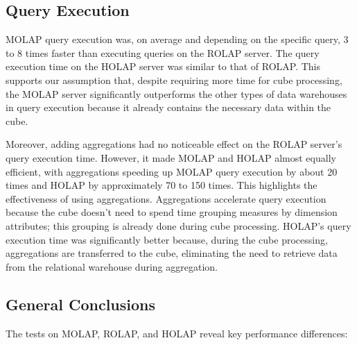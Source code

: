 \documentclass[a4paper,12pt]{article} %
\begin{document}
\subsection{Query Execution}
MOLAP query execution was, on average and depending on the specific query, 3 to 8 times faster than executing queries on the ROLAP server. The query execution time on the HOLAP server was similar to that of ROLAP. This supports our assumption that, despite requiring more time for cube processing, the MOLAP server significantly outperforms the other types of data warehouses in query execution because it already contains the necessary data within the cube.

Moreover, adding aggregations had no noticeable effect on the ROLAP server's query execution time. However, it made MOLAP and HOLAP almost equally efficient, with aggregations speeding up MOLAP query execution by about 20 times and HOLAP by approximately 70 to 150 times. This highlights the effectiveness of using aggregations. Aggregations accelerate query execution because the cube doesn't need to spend time grouping measures by dimension attributes; this grouping is already done during cube processing. HOLAP's query execution time was significantly better because, during the cube processing, aggregations are transferred to the cube, eliminating the need to retrieve data from the relational warehouse during aggregation.

\newpage

\subsection{General Conclusions}
The tests on MOLAP, ROLAP, and HOLAP reveal key performance differences:
\end{document}
